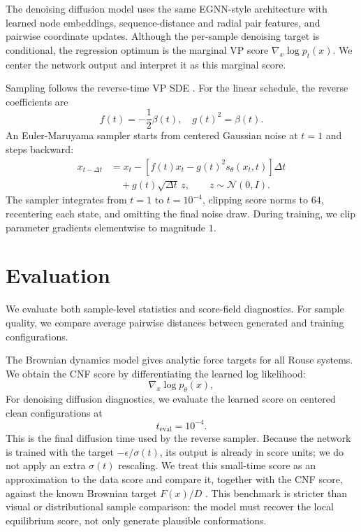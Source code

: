 \documentclass[reprint,amsmath,amssymb,aps,pra,10pt]{revtex4-2}
\begin{document}
The denoising diffusion model uses the same EGNN-style architecture with learned node embeddings, sequence-distance and radial pair features, and pairwise coordinate updates.
Although the per-sample denoising target is conditional, the regression optimum is the marginal VP score $\nabla_x \log p_t(x)$.
We center the network output and interpret it as this marginal score.

Sampling follows the reverse-time VP SDE \cite{song2021}.
For the linear schedule, the reverse coefficients are
\begin{equation}
    f(t) = -\frac{1}{2}\beta(t),
    \quad
    g(t)^2 = \beta(t).
\end{equation}
An Euler-Maruyama sampler starts from centered Gaussian noise at $t=1$ and steps backward:
\begin{align}
    x_{t-\Delta t}
    &=
    x_t
    -
    \left[
        f(t)x_t
        -
        g(t)^2 s_\theta(x_t,t)
    \right]\Delta t
    \nonumber \\
    &\quad
    +
    g(t)\sqrt{\Delta t}\,z,
    \qquad
    z \sim \mathcal{N}(0,I).
\end{align}
The sampler integrates from $t=1$ to $t=10^{-4}$, clipping score norms to $64$, recentering each state, and omitting the final noise draw.
During training, we clip parameter gradients elementwise to magnitude $1$.

\section{Evaluation}

We evaluate both sample-level statistics and score-field diagnostics.
For sample quality, we compare average pairwise distances between generated and training configurations.

The Brownian dynamics model gives analytic force targets for all Rouse systems.
We obtain the CNF score by differentiating the learned log likelihood:
\begin{equation}
    \nabla_x \log p_\theta(x),
\end{equation}
For denoising diffusion diagnostics, we evaluate the learned score on centered clean configurations at
\begin{equation}
    t_{\mathrm{eval}} = 10^{-4}.
\end{equation}
This is the final diffusion time used by the reverse sampler.
Because the network is trained with the target $-\epsilon/\sigma(t)$, its output is already in score units; we do not apply an extra $\sigma(t)$ rescaling.
We treat this small-time score as an approximation to the data score and compare it, together with the CNF score, against the known Brownian target $F(x)/D$ \cite{arts2023}.
This benchmark is stricter than visual or distributional sample comparison: the model must recover the local equilibrium score, not only generate plausible conformations.
\end{document}
